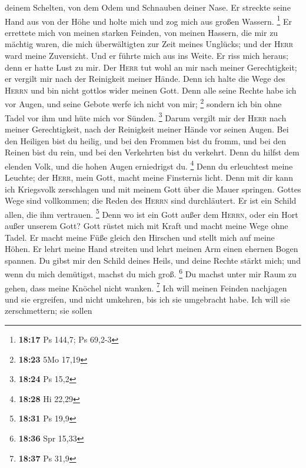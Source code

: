 deinem Schelten, von dem Odem und Schnauben deiner Nase. 
Er streckte seine Hand aus von der Höhe und holte mich und zog mich aus
großen Wassern. \footnote{\textbf{18:17} Ps 144,7; Ps 69,2-3}
 Er errettete mich von meinen starken Feinden, von meinen
Hassern, die mir zu mächtig waren,  die mich
überwältigten zur Zeit meines Unglücks; und der \textsc{Herr} ward meine
Zuversicht.  Und er führte mich aus ins Weite. Er riss
mich heraus; denn er hatte Lust zu mir.  Der
\textsc{Herr} tut wohl an mir nach meiner Gerechtigkeit; er vergilt mir
nach der Reinigkeit meiner Hände.  Denn ich halte die
Wege des \textsc{Herrn} und bin nicht gottlos wider meinen Gott.
 Denn alle seine Rechte habe ich vor Augen, und seine
Gebote werfe ich nicht von mir; \footnote{\textbf{18:23} 5Mo 17,19}
 sondern ich bin ohne Tadel vor ihm und hüte mich vor
Sünden. \footnote{\textbf{18:24} Ps 15,2}  Darum vergilt
mir der \textsc{Herr} nach meiner Gerechtigkeit, nach der Reinigkeit
meiner Hände vor seinen Augen.  Bei den Heiligen bist du
heilig, und bei den Frommen bist du fromm,  und bei den
Reinen bist du rein, und bei den Verkehrten bist du verkehrt.
 Denn du hilfst dem elenden Volk, und die hohen Augen
erniedrigst du. \footnote{\textbf{18:28} Hi 22,29}  Denn
du erleuchtest meine Leuchte; der \textsc{Herr}, mein Gott, macht meine
Finsternis licht.  Denn mit dir kann ich Kriegsvolk
zerschlagen und mit meinem Gott über die Mauer springen. 
Gottes Wege sind vollkommen; die Reden des \textsc{Herrn} sind
durchläutert. Er ist ein Schild allen, die ihm vertrauen. \footnote{\textbf{18:31}
  Ps 19,9}  Denn wo ist ein Gott außer dem
\textsc{Herrn}, oder ein Hort außer unserem Gott?  Gott
rüstet mich mit Kraft und macht meine Wege ohne Tadel. 
Er macht meine Füße gleich den Hirschen und stellt mich auf meine Höhen.
 Er lehrt meine Hand streiten und lehrt meinen Arm einen
ehernen Bogen spannen.  Du gibst mir den Schild deines
Heils, und deine Rechte stärkt mich; und wenn du mich demütigst, machst
du mich groß. \footnote{\textbf{18:36} Spr 15,33}  Du
machst unter mir Raum zu gehen, dass meine Knöchel nicht wanken.
\footnote{\textbf{18:37} Ps 31,9}  Ich will meinen
Feinden nachjagen und sie ergreifen, und nicht umkehren, bis ich sie
umgebracht habe.  Ich will sie zerschmettern; sie sollen
